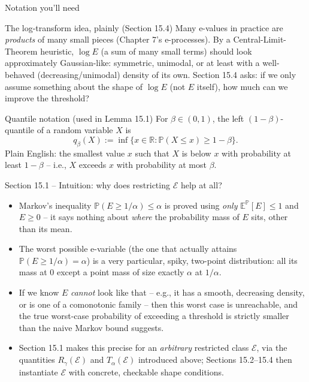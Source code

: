 \documentclass[aspectratio=169,10pt]{beamer}
\newcommand{\PP}{\mathbb{P}}
\newcommand{\EE}{\mathbb{E}}
\newcommand{\RR}{\mathbb{R}}
\newcommand{\calE}{\mathcal{E}}
\begin{document}
\begin{frame}[allowframebreaks]{Notation you'll need}
  \begin{block}{The log-transform idea, plainly (Section 15.4)}
    Many e-values in practice are \emph{products} of many small pieces (Chapter 7's e-processes). By a Central-Limit-Theorem heuristic, $\log E$ (a sum of many small terms) should look approximately Gaussian-like: symmetric, unimodal, or at least with a well-behaved (decreasing/unimodal) density of its own. Section 15.4 asks: if we only assume something about the shape of $\log E$ (not $E$ itself), how much can we improve the threshold?
  \end{block}

  \begin{block}{Quantile notation (used in Lemma 15.1)}
    For $\beta\in(0,1)$, the left $(1-\beta)$-quantile of a random variable $X$ is
    \[
      q_\beta(X) := \inf\{x\in\RR : \PP(X\le x)\ge 1-\beta\}.
    \]
    Plain English: the smallest value $x$ such that $X$ is below $x$ with probability at least $1-\beta$ -- i.e., $X$ exceeds $x$ with probability at most $\beta$.
  \end{block}
\end{frame}

\begin{frame}{Section 15.1 -- Intuition: why does restricting $\calE$ help at all?}
  \begin{itemize}
    \item Markov's inequality $\PP(E\ge1/\alpha)\le\alpha$ is proved using \emph{only} $\EE^\PP[E]\le1$ and $E\ge0$ -- it says nothing about \emph{where} the probability mass of $E$ sits, other than its mean.
    \item The worst possible e-variable (the one that actually attains $\PP(E\ge1/\alpha)=\alpha$) is a very particular, spiky, two-point distribution: all its mass at $0$ except a point mass of size exactly $\alpha$ at $1/\alpha$.
    \item If we know $E$ \emph{cannot} look like that -- e.g., it has a smooth, decreasing density, or is one of a comonotonic family -- then this worst case is unreachable, and the true worst-case probability of exceeding a threshold is strictly smaller than the naive Markov bound suggests.
    \item Section 15.1 makes this precise for an \emph{arbitrary} restricted class $\calE$, via the quantities $R_\gamma(\calE)$ and $T_\alpha(\calE)$ introduced above; Sections 15.2--15.4 then instantiate $\calE$ with concrete, checkable shape conditions.
  \end{itemize}
\end{frame}
\end{document}
